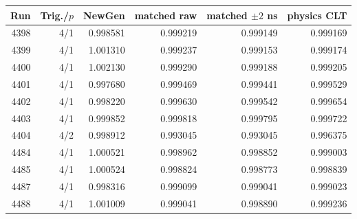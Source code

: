 \begin{tabular}{rrrrrr}\toprule Run & Trig./$p$ & NewGen & matched raw & matched $\pm2$ ns & physics CLT\\\midrule
4398 & 4/1 & 0.998581 & 0.999219 & 0.999149 & 0.999169\\
4399 & 4/1 & 1.001310 & 0.999237 & 0.999153 & 0.999174\\
4400 & 4/1 & 1.002130 & 0.999290 & 0.999188 & 0.999205\\
4401 & 4/1 & 0.997680 & 0.999469 & 0.999441 & 0.999529\\
4402 & 4/1 & 0.998220 & 0.999630 & 0.999542 & 0.999654\\
4403 & 4/1 & 0.999852 & 0.999818 & 0.999795 & 0.999722\\
4404 & 4/2 & 0.998912 & 0.993045 & 0.993045 & 0.996375\\
4484 & 4/1 & 1.000521 & 0.998962 & 0.998852 & 0.999003\\
4485 & 4/1 & 1.000524 & 0.998824 & 0.998773 & 0.998839\\
4487 & 4/1 & 0.998316 & 0.999099 & 0.999041 & 0.999023\\
4488 & 4/1 & 1.001009 & 0.999041 & 0.998890 & 0.999236\\
\bottomrule\end{tabular}